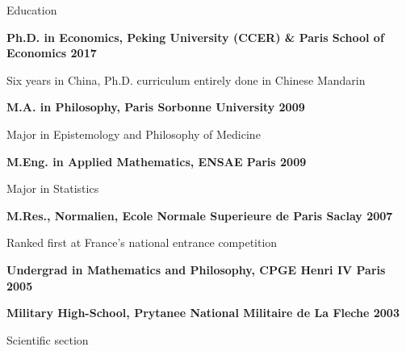 \documentclass[usegeometry, 10pt, a4paper]{cv} %
\newcommand{\activite}[1]{\textbf{#1}\ }
\newenvironment{normal-itemize}{
\begin{itemize}
     \setlength{\itemsep}{1.3mm}
     \setlength{\parskip}{0pt}
     \setlength{\parsep}{0pt}}
{\end{itemize}
}
\begin{document}
\begin{rubriquetableau}[0.95\textwidth]{Education}\\
\vspace{-0.6cm}

\activite{Ph.D. in Economics, Peking University (CCER) \& Paris School of Economics \hfill 2017}\\
\vspace{-0.4cm}
\renewcommand\labelitemi{}
\begin{normal-itemize}
\small
\vspace{-0.3cm}
\item Six years in China, Ph.D. curriculum entirely done in Chinese Mandarin
\end{normal-itemize}
\vspace{0.2cm}

\activite{M.A. in Philosophy, Paris Sorbonne University \hfill 2009}\\
\vspace{-0.2cm}
\renewcommand\labelitemi{}
\begin{normal-itemize}
\small
\vspace{-0.3cm}
\item Major in Epistemology and Philosophy of Medicine
\end{normal-itemize}
\vspace{0.2cm}

\activite{M.Eng. in Applied Mathematics, ENSAE Paris \hfill 2009}\\
\vspace{-0.2cm}
\renewcommand\labelitemi{}
\begin{normal-itemize}
\small
\vspace{-0.3cm}
\item Major in Statistics
\end{normal-itemize}
\vspace{0.2cm}

\activite{M.Res., Normalien, Ecole Normale Superieure de Paris Saclay \hfill 2007}\\
\vspace{-0.2cm}
\renewcommand\labelitemi{}
\begin{normal-itemize}
\small
\vspace{-0.3cm}
\item Ranked first at France's national entrance competition 
\end{normal-itemize}
\vspace{0.2cm}

\activite{Undergrad in Mathematics and Philosophy, CPGE Henri IV Paris \hfill
  2005}\\
\vspace{0.2cm}

\activite{Military High-School, Prytanee National Militaire de La Fleche \hfill 2003}\\
\vspace{-0.2cm}
\renewcommand\labelitemi{}
\begin{normal-itemize}
\small
\vspace{-0.3cm}
\item Scientific section
\end{normal-itemize}

\normalsize
\end{rubriquetableau}
\end{document}

